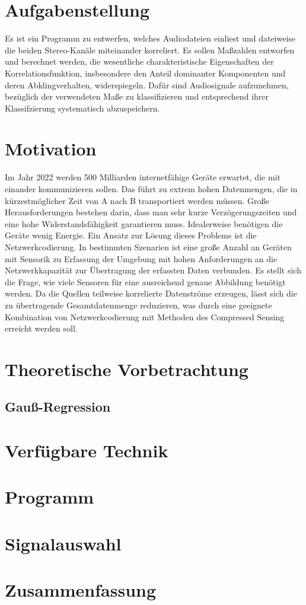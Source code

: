 \section{Aufgabenstellung}
Es ist ein Programm zu entwerfen, welches Audiodateien einliest und dateiweise die beiden Stereo-Kanäle miteinander korreliert. Es sollen Maßzahlen entworfen und berechnet werden, die wesentliche charakteristische Eigenschaften der Korrelationsfunktion, insbesondere den Anteil dominanter Komponenten und deren Abklingverhalten, widerspiegeln. Dafür sind Audiosignale aufzunehmen, bezüglich der verwendeten Maße zu klassifizieren und entsprechend ihrer Klassifzierung systematisch abzuspeichern.
\section{Motivation}
Im Jahr 2022 werden 500 Milliarden internetfähige Geräte erwartet, die mit einander kommunizieren sollen. Das führt zu extrem hohen Datenmengen, die in kürzestmöglicher Zeit von A nach B transportiert werden müssen. Große Herausforderungen bestehen darin, dass man sehr kurze Verzögerungszeiten und eine hohe Widerstandsfähigkeit garantieren muss. Idealerweise benötigen die Geräte wenig Energie. Ein Ansatz zur Lösung dieses Problems ist die Netzwerkcodierung.\newline
In bestimmten Szenarien ist eine große Anzahl an Geräten mit Sensorik zu Erfassung der Umgebung mit hohen Anforderungen an die Netzwerkkapazität zur Übertragung der erfassten Daten verbunden. Es stellt sich die Frage, wie viele Sensoren für eine ausreichend genaue Abbildung benötigt werden. Da die Quellen teilweise korrelierte Datenströme erzeugen, lässt sich die zu übertragende Gesamtdatenmenge reduzieren, was durch eine geeignete Kombination von Netzwerkcodierung mit Methoden des Compressed Sensing erreicht werden soll.

\section{Theoretische Vorbetrachtung}


\subsection{Gauß-Regression}

\section{Verfügbare Technik}

\section{Programm}


\section{Signalauswahl}


\section{Zusammenfassung}
